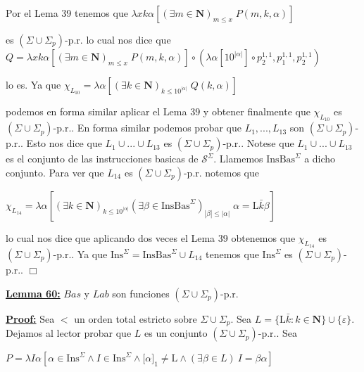 Por el Lema 39 tenemos que
\(\displaystyle \lambda xk\alpha \left[ (\exists m\in \mathbf{N})_{m\leq x}\;P(m,k,\alpha ) \right] \)

es \((\Sigma \cup \Sigma _{p})\)-p.r. lo cual nos dice que
\(\displaystyle Q=\lambda xk\alpha \left[ (\exists m\in \mathbf{N})_{m\leq x}\;P(m,k,\alpha ) \right] \circ (\lambda \alpha \left[ 10^{\left\vert \alpha \right\vert } \right] \circ p_{2}^{1,1},p_{1}^{1,1},p_{2}^{1,1}) \)

lo es. Ya que
\(\displaystyle \chi _{L_{10}}=\lambda \alpha \left[ (\exists k\in \mathbf{N})_{k\leq 10^{\left\vert \alpha \right\vert }}\;Q(k,\alpha )\right] \)

podemos en forma similar aplicar el Lema 39 y obtener finalmente que \(\chi _{L_{10}}\) es \((\Sigma \cup \Sigma _{p})\)-p.r..
En forma similar podemos probar que \(L_{1},...,L_{13}\) son \((\Sigma \cup \Sigma _{p})\)-p.r.. Esto nos dice que \(L_{1}\cup ...\cup L_{13}\) es \((\Sigma \cup \Sigma _{p})\)-p.r.. Notese que \(L_{1}\cup ...\cup L_{13}\) es el conjunto de las instrucciones basicas de \(\mathcal{S}^{\Sigma }\). Llamemos \( \mathrm{InsBas}^{\Sigma }\) a dicho conjunto. Para ver que \(L_{14}\) es \( (\Sigma \cup \Sigma _{p})\)-p.r. notemos que

\(\displaystyle \chi _{L_{14}}=\lambda \alpha \left[ (\exists k\in \mathbf{N})_{k\leq 10^{\left\vert \alpha \right\vert }}(\exists \beta \in \mathrm{InsBas} ^{\Sigma })_{\left\vert \beta \right\vert \leq \left\vert \alpha \right\vert }\;\alpha =\mathrm{L}\bar{k}\beta \right] \)

lo cual nos dice que aplicando dos veces el Lema 39 obtenemos que \(\chi _{L_{14}}\) es \((\Sigma \cup \Sigma _{p})\)-p.r.. Ya que \( \mathrm{Ins}^{\Sigma }=\mathrm{InsBas}^{\Sigma }\cup L_{14}\) tenemos que \( \mathrm{Ins}^{\Sigma }\) es \((\Sigma \cup \Sigma _{p})\)-p.r.. \(\Box\)


\textbf{\underline{Lemma 60:}} \(Bas\) y \(Lab\) son funciones \((\Sigma \cup \Sigma _{p})\)-p.r.

\textbf{\underline{Proof:}} Sea \(< \) un orden total estricto sobre \(\Sigma \cup \Sigma _{p}\). Sea \(L=\{ \mathrm{L}\bar{k}:k\in \mathbf{N}\}\cup \{\varepsilon \}\). Dejamos al lector probar que \(L\) es un conjunto \((\Sigma \cup \Sigma _{p})\)-p.r.. Sea

\(\displaystyle P=\lambda I\alpha \left[ \alpha \in \mathrm{Ins}^{\Sigma }\wedge I\in \mathrm{Ins}^{\Sigma }\wedge \lbrack \alpha ]_{1}\neq \mathrm{L}\wedge (\exists \beta \in L)\ I=\beta \alpha \right] \)

